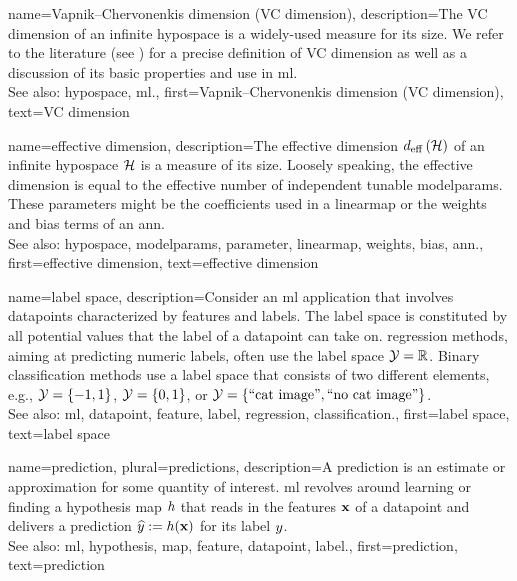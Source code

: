 {name={Vapnik–Chervonenkis dimension (VC dimension)},
	description={The VC dimension of an infinite \gls{hypospace} is a widely-used measure 
		for its size. We refer to the literature (see \cite{ShalevMLBook}) for a precise definition of VC dimension 
		as well as a discussion of its basic properties and use in \gls{ml}.
					\\ 
		See also: \gls{hypospace}, \gls{ml}.},
	first={Vapnik–Chervonenkis dimension (VC dimension)},
	text={VC dimension}  
}

{name={effective dimension},
	description={The effective dimension $d_{\rm eff} \left( \mathcal{H} \right)$ of 
		an infinite \gls{hypospace} $\mathcal{H}$ is a measure of its size. Loosely speaking, the 
		effective dimension is equal to the effective number of independent tunable \gls{modelparams}. 
		These \glspl{parameter} might be the coefficients used in a \gls{linearmap} or the 
		\gls{weights} and \gls{bias} terms of an \gls{ann}.
					\\ 
		See also: \gls{hypospace}, \gls{modelparams}, \gls{parameter}, \gls{linearmap}, \gls{weights}, \gls{bias}, \gls{ann}.},
	first={effective dimension},
	text={effective dimension}  
}

{name={label space},
	description={Consider an \gls{ml} application that involves \glspl{datapoint} characterized by \glspl{feature} 
		and \glspl{label}. The \gls{label} space is constituted by all potential values that the \gls{label} 
		of a \gls{datapoint} can take on. \Gls{regression} methods, aiming at predicting numeric \glspl{label}, often
		 use the \gls{label} space $\mathcal{Y} = \mathbb{R}$. Binary \gls{classification} methods use a \gls{label} space 
 		that consists of two different elements, e.g., $\mathcal{Y} =\{-1,1\}$, $\mathcal{Y}=\{0,1\}$, 
		or $\mathcal{Y} = \{ \mbox{``cat image''}, \mbox{``no cat image''} \}$.
					\\ 
		See also: \gls{ml}, \gls{datapoint}, \gls{feature}, \gls{label}, \gls{regression}, \gls{classification}.}, 
	first={label space},
	text={label space}  
}

{name={prediction}, plural={predictions},
	description={A prediction is an estimate or approximation for some 
		quantity of interest. \Gls{ml} revolves around learning or finding a \gls{hypothesis} \gls{map} $h$ 
		that reads in the \glspl{feature} ${\bf x}$ of a \gls{datapoint} and delivers a prediction 
		$\widehat{y} := h({\bf x})$ for its \gls{label} $y$.
					\\ 
		See also: \gls{ml}, \gls{hypothesis}, \gls{map}, \gls{feature}, \gls{datapoint}, \gls{label}.},
	first={prediction},
	text={prediction}  
}


